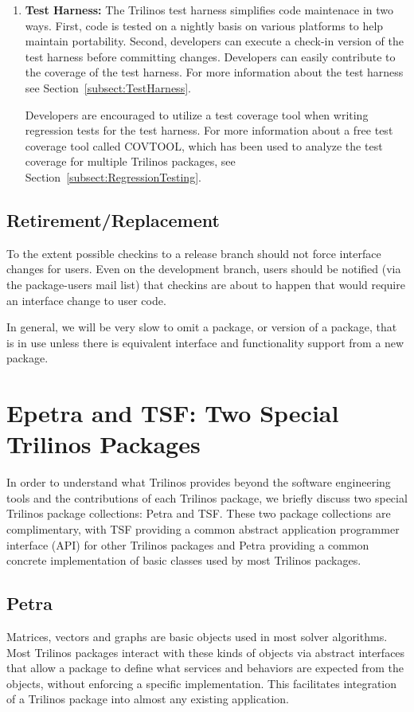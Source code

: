 \documentclass[12pt,strict]{TrilinosDevGuide}
\begin{document}
\begin{enumerate}
\item {\bf Test Harness:} 
The Trilinos test harness simplifies code maintenace in two ways.  First, code 
is tested on a nightly basis on various platforms to help maintain portability.
Second, developers can execute a check-in version of the test harness before 
committing changes.  Developers can easily contribute to the coverage of the 
test harness.  For more information about the test harness see 
Section~\ref{subsect:TestHarness}.

Developers are encouraged to utilize a test coverage tool when writing  
regression tests for the test harness.  For more information about a free test 
coverage tool called COVTOOL, which has been used to analyze the test coverage 
for multiple Trilinos packages, see Section~\ref{subsect:RegressionTesting}.
\end{enumerate}


\subsection{Retirement/Replacement}
To the extent possible checkins to a release branch should not force interface 
changes for users.  Even on the development branch, users should be notified 
(via the package-users mail list) that checkins are about to happen that would 
require an interface change to user code.

In general, we will be very slow to omit a package, or version of a package, 
that is in use unless there is equivalent interface and functionality support 
from a new package.

\section{Epetra and TSF: Two Special Trilinos Packages}
\label{Section:EpetraAndTSF}
In order to understand what Trilinos provides beyond the software
engineering tools and the
contributions of each Trilinos package, we briefly discuss two special
Trilinos package collections: Petra and TSF.  These two package
collections are complimentary,
with TSF providing a common abstract application
programmer interface (API) for other Trilinos packages and Petra
providing a common concrete implementation of basic classes used by most
Trilinos packages.

\subsection{Petra}
Matrices, vectors and graphs are basic objects used in most solver
algorithms. Most Trilinos
packages interact with these kinds of objects via abstract interfaces that
allow a package to define what services and behaviors are expected from the objects,
without enforcing a specific implementation.   This facilitates
integration of a Trilinos package into almost any existing
application.
\end{document}
